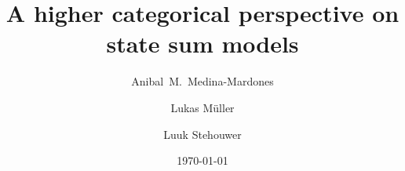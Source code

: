\documentclass{amsart}
\title{A higher categorical perspective on state sum models}
\author[Medina-Mardones]{Anibal~M.~Medina-Mardones}
\author[Müller]{Lukas Müller}
\author[Stehouwer]{Luuk Stehouwer}
\date{\today}
\begin{document}
	
	\maketitle
	
	
    
 	
    
    
   	
	\sloppy
	\printbibliography
	\todos
\end{document}
